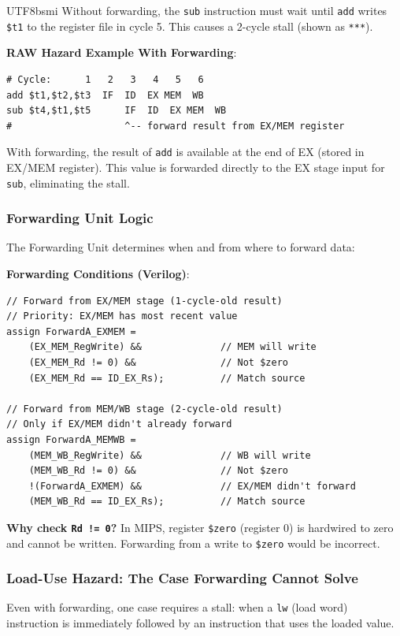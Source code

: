 \documentclass[journal,twoside]{IEEEtran}
\begin{document}
\begin{CJK}{UTF8}{bsmi}
Without forwarding, the \texttt{sub} instruction must wait until \texttt{add} writes \texttt{\$t1} to the register file in cycle 5. This causes a 2-cycle stall (shown as \texttt{***}).

\textbf{RAW Hazard Example With Forwarding}:
\begin{lstlisting}
# Cycle:      1   2   3   4   5   6
add $t1,$t2,$t3  IF  ID  EX MEM  WB
sub $t4,$t1,$t5      IF  ID  EX MEM  WB
#                    ^-- forward result from EX/MEM register
\end{lstlisting}

With forwarding, the result of \texttt{add} is available at the end of EX (stored in EX/MEM register). This value is forwarded directly to the EX stage input for \texttt{sub}, eliminating the stall.

\subsubsection{Forwarding Unit Logic}
The Forwarding Unit determines when and from where to forward data:

\textbf{Forwarding Conditions (Verilog)}:
\begin{lstlisting}
// Forward from EX/MEM stage (1-cycle-old result)
// Priority: EX/MEM has most recent value
assign ForwardA_EXMEM = 
    (EX_MEM_RegWrite) &&              // MEM will write
    (EX_MEM_Rd != 0) &&               // Not $zero
    (EX_MEM_Rd == ID_EX_Rs);          // Match source

// Forward from MEM/WB stage (2-cycle-old result)
// Only if EX/MEM didn't already forward
assign ForwardA_MEMWB = 
    (MEM_WB_RegWrite) &&              // WB will write
    (MEM_WB_Rd != 0) &&               // Not $zero
    !(ForwardA_EXMEM) &&              // EX/MEM didn't forward
    (MEM_WB_Rd == ID_EX_Rs);          // Match source
\end{lstlisting}

\textbf{Why check \texttt{Rd != 0}?} In MIPS, register \texttt{\$zero} (register 0) is hardwired to zero and cannot be written. Forwarding from a write to \texttt{\$zero} would be incorrect.

\subsubsection{Load-Use Hazard: The Case Forwarding Cannot Solve}
Even with forwarding, one case requires a stall: when a \texttt{lw} (load word) instruction is immediately followed by an instruction that uses the loaded value.


\end{CJK}
\end{document}
